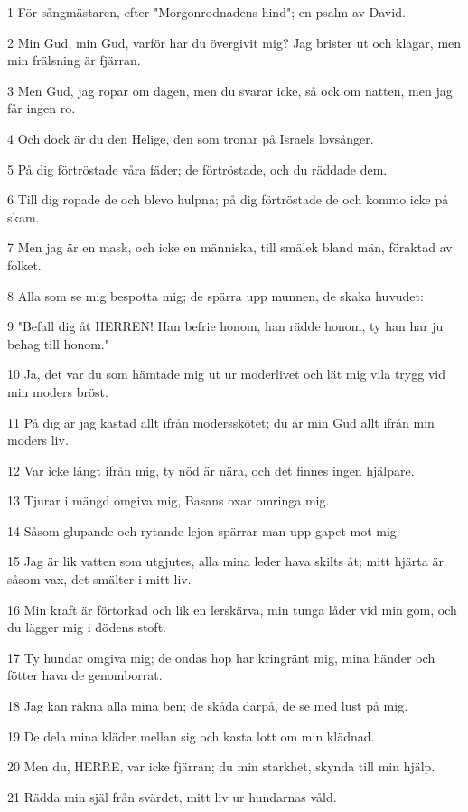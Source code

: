 \par 1 För sångmästaren, efter "Morgonrodnadens hind"; en psalm av David.
\par 2 Min Gud, min Gud, varför har du övergivit mig? Jag brister ut och klagar, men min frälsning är fjärran.
\par 3 Men Gud, jag ropar om dagen, men du svarar icke, så ock om natten, men jag får ingen ro.
\par 4 Och dock är du den Helige, den som tronar på Israels lovsånger.
\par 5 På dig förtröstade våra fäder; de förtröstade, och du räddade dem.
\par 6 Till dig ropade de och blevo hulpna; på dig förtröstade de och kommo icke på skam.
\par 7 Men jag är en mask, och icke en människa, till smälek bland män, föraktad av folket.
\par 8 Alla som se mig bespotta mig; de spärra upp munnen, de skaka huvudet:
\par 9 "Befall dig åt HERREN! Han befrie honom, han rädde honom, ty han har ju behag till honom."
\par 10 Ja, det var du som hämtade mig ut ur moderlivet och lät mig vila trygg vid min moders bröst.
\par 11 På dig är jag kastad allt ifrån modersskötet; du är min Gud allt ifrån min moders liv.
\par 12 Var icke långt ifrån mig, ty nöd är nära, och det finnes ingen hjälpare.
\par 13 Tjurar i mängd omgiva mig, Basans oxar omringa mig.
\par 14 Såsom glupande och rytande lejon spärrar man upp gapet mot mig.
\par 15 Jag är lik vatten som utgjutes, alla mina leder hava skilts åt; mitt hjärta är såsom vax, det smälter i mitt liv.
\par 16 Min kraft är förtorkad och lik en lerskärva, min tunga låder vid min gom, och du lägger mig i dödens stoft.
\par 17 Ty hundar omgiva mig; de ondas hop har kringränt mig, mina händer och fötter hava de genomborrat.
\par 18 Jag kan räkna alla mina ben; de skåda därpå, de se med lust på mig.
\par 19 De dela mina kläder mellan sig och kasta lott om min klädnad.
\par 20 Men du, HERRE, var icke fjärran; du min starkhet, skynda till min hjälp.
\par 21 Rädda min själ från svärdet, mitt liv ur hundarnas våld.
